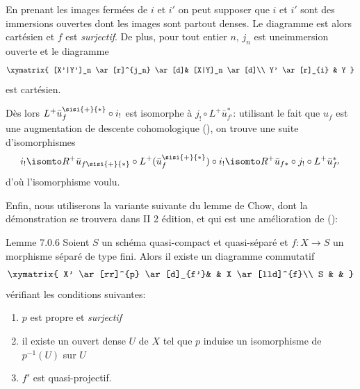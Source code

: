 \documentclass[10pt]{../fichiers-configuration-latex/smfart}
\begin{document}
En prenant les images fermées de $i$ et $i'$ on peut supposer que $i$
et $i'$ sont des immersions ouvertes dont les images sont partout
denses. Le diagramme  est alors cartésien et $f$ est
\emph{surjectif}. De plus, pour tout entier $n$, $j_{n}$ est
une\pageoriginale immersion ouverte et le diagramme
\[
\xymatrix{
[X'|Y']_n        \ar[r]^{j_n} \ar[d]& [X|Y]_n \ar[d]\\
Y'  \ar[r]_{i} & Y
}
\]
est cartésien.

Dès lors $L^{+}\bar{u}_{f}^{\sisi{+}{*}}\circ i_{!}$ est isomorphe à $j_{!}\circ
L^{+}\bar{u}_{f'}^{\ast}$: utilisant le fait que $u_{f}$ est une
augmentation de descente cohomologique (), on
trouve une suite d'isomorphismes
\[
i_{!}\isomto R^{+}\bar{u}_{f\sisi{+}{*}}\circ
L^{+}(\bar{u}^{\sisi{+}{*}}_{f})\circ i_{!}\isomto
R^{+}\bar{u}_{f\ast}\circ j_{!}\circ L^{+}\bar{u}_{f'}^{\ast}
\]
d'où l'isomorphisme voulu.

Enfin, nous utiliserons la variante suivante du lemme de Chow, dont la
démonstration se trouvera dans \EGA II 2 édition, et qui est une
amélioration de ():

\begin{enonce*}{Lemme 7.0.6}
Soient $S$ un schéma quasi-compact et quasi-séparé et $f:X\rightarrow
S$ un morphisme séparé de type fini. Alors il existe un diagramme
commutatif
\[
\xymatrix{
X' \ar[rr]^{p} \ar[d]_{f'}& & X \ar[lld]^{f}\\
S                         & &
}
\]
vérifiant les conditions suivantes:
\begin{enumerate}
\renewcommand{\theenumi}{\roman{enumi}}
\renewcommand{\labelenumi}{(\theenumi)}
\item $p$ est propre et \emph{surjectif}

\item il existe un ouvert dense $U$ de $X$ tel que $p$ induise un
isomorphisme de $p^{-1}(U)$ sur $U$

\item $f'$ est quasi-projectif.
\end{enumerate}
\end{enonce*}
\end{document}
